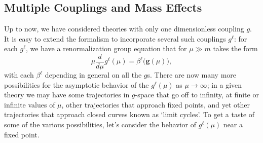 
\subsection{Multiple Couplings and Mass Effects}

Up to now, we have considered theories with only one dimensionless coupling $g$. It is easy to extend the formalism to incorporate several such couplings $g^\ell$: for each $g^\ell$, we have a renormalization group equation that for $\mu\gg m$ takes the form
\begin{equation}
\mu\frac{d}{d\mu}g^\ell(\mu)=\beta^\ell\bigl(\mathbf{g}(\mu)\bigr),
\tag{18.4.1}\label{eq:18.4.1}
\end{equation}
with each $\beta^\ell$ depending in general on all the $g$s. There are now many more possibilities for the asymptotic behavior of the $g^\ell(\mu)$ as $\mu\to\infty$; in a given theory we may have some trajectories in $g$-space that go off to infinity, at finite or infinite values of $\mu$, other trajectories that approach fixed points, and yet other trajectories that approach closed curves known as `limit cycles'. To get a taste of some of the various possibilities, let's consider the behavior of $g^\ell(\mu)$ near a fixed point.

